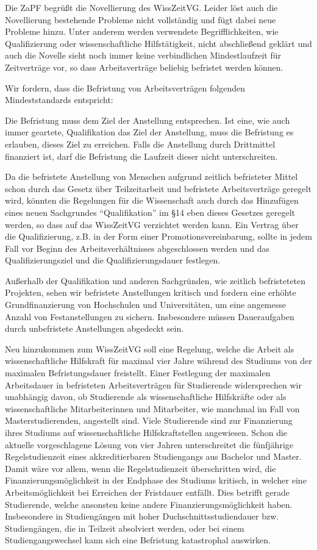Die ZaPF begrüßt die Novellierung des WissZeitVG. Leider löst auch die
Novellierung bestehende Probleme nicht vollständig und fügt dabei neue
Probleme hinzu. Unter anderem werden verwendete Begrifflichkeiten, wie
\glqq{}Qualifizierung\grqq{} oder  \glqq{}wissenschaftliche Hilfstätigkeit\grqq{}, nicht
abschließend geklärt und auch die Novelle sieht noch immer keine verbindlichen
Mindestlaufzeit für Zeitverträge vor, so dass Arbeitsverträge beliebig
befristet werden können.

Wir fordern, dass die Befristung von Arbeitsverträgen folgenden Mindeststandards
entspricht:

Die Befristung muss dem Ziel der Anstellung entsprechen. Ist eine, wie auch
immer geartete, Qualifikation das Ziel der Anstellung, muss die Befristung es
erlauben, dieses Ziel zu erreichen. Falls die Anstellung durch Drittmittel
finanziert ist, darf die Befristung die Laufzeit dieser nicht unterschreiten.

Da die befristete Anstellung von Menschen aufgrund zeitlich befristeter Mittel
schon durch das Gesetz über Teilzeitarbeit und befristete Arbeitsverträge
geregelt wird, könnten die Regelungen für die Wissenschaft auch durch das
Hinzufügen eines neuen Sachgrundes ``Qualifikation'' im §14 eben dieses
Gesetzes geregelt werden, so dass auf das WissZeitVG verzichtet werden kann.
Ein Vertrag über die Qualifizierung, z.B. in der Form einer
Promotionsvereinbarung, sollte in jedem Fall vor Beginn des
Arbeitsverhältnisses abgeschlossen werden und das Qualifizierungsziel und die
Qualifizierungsdauer festlegen.

Außerhalb der Qualifikation und anderen Sachgründen, wie zeitlich befristeteten
Projekten, sehen wir befristete Anstellungen kritisch und fordern eine erhöhte
Grundfinanzierung von Hochschulen und Universitäten, um eine angemesse Anzahl
von Festanstellungen zu sichern. Insbesondere müssen Daueraufgaben durch
unbefristete Anstellungen abgedeckt sein.

Neu hinzukommen zum WissZeitVG soll eine Regelung, welche die Arbeit als
wissenschaftliche Hilfskraft für maximal vier Jahre während des Studiums von
der maximalen Befristungsdauer freistellt. Einer Festlegung der maximalen
Arbeitsdauer in befristeten Arbeitsverträgen für Studierende widersprechen wir
unabhängig davon, ob Studierende als wissenschaftliche Hilfskräfte oder als
wissenschaftliche Mitarbeiterinnen und Mitarbeiter, wie manchmal im Fall von
Masterstudierenden, angestellt sind. Viele Studierende sind zur Finanzierung
ihres Studiums auf wissenschaftliche Hilfskraftstellen angewiesen. Schon die
aktuelle vorgeschlagene Lösung von vier Jahren unterschreitet die fünfjährige
Regelstudienzeit eines akkreditierbaren Studiengangs aus Bachelor und Master.
Damit wäre vor allem, wenn die Regelstudienzeit überschritten wird, die
Finanzierungsmöglichkeit in der Endphase des Studiums kritisch, in welcher eine
Arbeitsmöglichkeit bei Erreichen der Fristdauer entfällt. Dies betrifft gerade
Studierende, welche ansonsten keine andere Finanzierungsmöglichkeit haben.
Insbesondere in Studiengängen mit hoher Duchschnittsstudiendauer bzw. Studiengängen,
die in Teilzeit absolviert werden, oder bei einem Studiengangswechsel kann sich
eine Befristung katastrophal auswirken.

